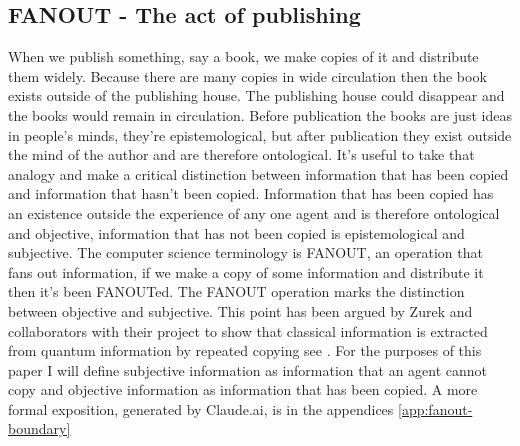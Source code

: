 \subsection{FANOUT - The act of publishing}
\label{sec:fanout-boundary}
When we publish something, say a book, we make copies of it and distribute them widely. Because
there are many copies in wide circulation then the book exists outside of the publishing house.
The publishing house could disappear and the books would remain in circulation. Before
publication the books are just ideas in people's minds, they're epistemological, but after
publication they exist outside the mind of the author and are therefore ontological. It's useful
to take that analogy and make a critical distinction between information that has been copied
and information that hasn't been copied. Information that has been copied has an existence
outside the experience of any one agent and is therefore ontological and objective, information
that has not been copied is epistemological and subjective. The computer science terminology is
FANOUT, an operation that fans out information, if we make a copy of some information and
distribute it then it's been FANOUTed. The FANOUT operation marks the distinction between
objective and subjective. This point has been argued by Zurek and collaborators with their
project to show that classical information is extracted from quantum information by repeated
copying see \autocite{zurek_2009, Zurek2002, Oliver_2004}. For the purposes of this paper I will
define subjective information as information that an agent cannot copy and objective information
as information that has been copied. A more formal exposition, generated by Claude.ai, is in the
appendices \ref{app:fanout-boundary}

